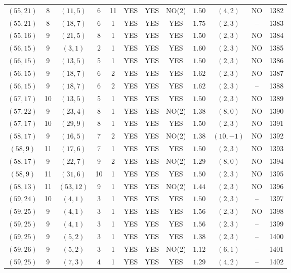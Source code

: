 \begin{longtable}{|c|c|c|c|c|c|c|c|c|c|c|c|}
$(55,21)$ & 8 & $(11,5)$ & 6 & 11 & YES & YES & NO(2) & $1.50$ & $(4,2)$ & NO & 1382\\
$(55,21)$ & 8 & $(18,7)$ & 6 & 1 & YES & YES & YES & $1.75$ & $(2,3)$ & -- & 1383\\
$(55,16)$ & 9 & $(21,5)$ & 8 & 1 & YES & YES & YES & $1.50$ & $(2,3)$ & NO & 1384\\
$(56,15)$ & 9 & $(3,1)$ & 2 & 1 & YES & YES & YES & $1.60$ & $(2,3)$ & NO & 1385\\
$(56,15)$ & 9 & $(13,5)$ & 5 & 1 & YES & YES & YES & $1.50$ & $(2,3)$ & NO & 1386\\
$(56,15)$ & 9 & $(18,7)$ & 6 & 2 & YES & YES & YES & $1.62$ & $(2,3)$ & NO & 1387\\
$(56,15)$ & 9 & $(18,7)$ & 6 & 2 & YES & YES & YES & $1.62$ & $(2,3)$ & -- & 1388\\
$(57,17)$ & 10 & $(13,5)$ & 5 & 1 & YES & YES & YES & $1.50$ & $(2,3)$ & NO & 1389\\
$(57,22)$ & 9 & $(23,4)$ & 8 & 1 & YES & YES & NO(2) & $1.38$ & $(8,0)$ & NO & 1390\\
$(57,17)$ & 10 & $(29,9)$ & 8 & 1 & YES & YES & YES & $1.50$ & $(2,3)$ & NO & 1391\\
$(58,17)$ & 9 & $(16,5)$ & 7 & 2 & YES & YES & NO(2) & $1.38$ & $(10,-1)$ & NO & 1392\\
$(58,9)$ & 11 & $(17,6)$ & 7 & 1 & YES & YES & YES & $1.50$ & $(2,3)$ & NO & 1393\\
$(58,17)$ & 9 & $(22,7)$ & 9 & 2 & YES & YES & NO(2) & $1.29$ & $(8,0)$ & NO & 1394\\
$(58,9)$ & 11 & $(31,6)$ & 10 & 1 & YES & YES & YES & $1.50$ & $(2,3)$ & NO & 1395\\
$(58,13)$ & 11 & $(53,12)$ & 9 & 1 & YES & YES & NO(2) & $1.44$ & $(2,3)$ & NO & 1396\\
$(59,24)$ & 10 & $(4,1)$ & 3 & 1 & YES & YES & YES & $1.50$ & $(2,3)$ & -- & 1397\\
$(59,25)$ & 9 & $(4,1)$ & 3 & 1 & YES & YES & YES & $1.56$ & $(2,3)$ & NO & 1398\\
$(59,25)$ & 9 & $(4,1)$ & 3 & 1 & YES & YES & YES & $1.56$ & $(2,3)$ & -- & 1399\\
$(59,25)$ & 9 & $(5,2)$ & 3 & 1 & YES & YES & YES & $1.38$ & $(2,3)$ & -- & 1400\\
$(59,26)$ & 9 & $(5,2)$ & 3 & 1 & YES & YES & NO(2) & $1.12$ & $(6,1)$ & -- & 1401\\
$(59,25)$ & 9 & $(7,3)$ & 4 & 1 & YES & YES & YES & $1.29$ & $(4,2)$ & -- & 1402\\

\end{longtable}
